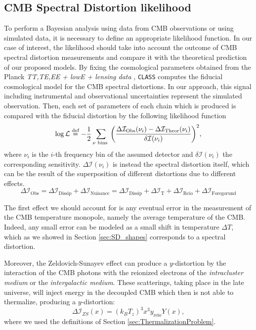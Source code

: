 \subsection{CMB Spectral Distortion likelihood} 
To perform a Bayesian analysis using data from CMB observations or using simulated data, it is necessary to define an appropriate likelihood function. In our case of interest, the likelihood should take into account the outcome of CMB spectral distortion measurements and compare it with the theoretical prediction of our proposed models. By fixing the cosmological parameters obtained from the Planck \emph{TT,TE,EE + lowE + lensing data} \cite{planck2018results}, \texttt{CLASS} computes the fiducial cosmological model for the CMB spectral distortions. In our approach, this signal including instrumental and observational uncertainties represent the simulated observation. Then, each set of parameters of each chain which is produced is compared with the fiducial distortion by the following likelihood function
\begin{equation}
    \log \mathcal L\stackrel{\text{def}}{=} -\frac12 \sum_{\nu \text{ bins }}\bigg(\frac{\Delta\mathcal I_\text{Obs}(\nu_i)-\Delta\mathcal I_\text{Theor}(\nu_i)}{\delta \mathcal I(\nu_i)}\bigg)^2,
\end{equation}
where $\nu_i$ is the $i$-th frequency bin of the assumed detector and $\delta \mathcal I(\nu_i)$ the corresponding sensitivity. $\Delta \mathcal I(\nu_i)$ is instead the spectral distortion itself, which can be the result of the superposition of different distortions due to different effects.
$$\Delta \mathcal I_\text{Obs}=\Delta\mathcal I_\text{Dissip}+\Delta \mathcal I_\text{Nuisance}=\Delta\mathcal I_\text{Dissip}+\Delta \mathcal I_\text{T}+\Delta \mathcal I_\text{Reio} +\Delta \mathcal I_\text{Foregorund}$$

The first effect we should account for is any eventual error in the measurement of the CMB temperature monopole, namely the average temperature of the CMB. Indeed, any small error can be modeled as a small shift in temperature $\Delta T$, which as we showed in Section \ref{sec:SD_shapes} corresponds to a spectral distortion.

Moreover, the Zeldovich-Sunayev effect \cite{Zeldovich1972} can produce a $y$-distortion by the interaction of the CMB photons with the reionized electrons of the \emph{intracluster medium} or the \emph{intergalactic medium}. These scatterings, taking place in the late universe, will inject energy in the decoupled CMB which then is not able to thermalize, producing a $y$-distortion:
$$ \Delta \mathcal I_{ZS}(x)=(k_BT_z)^3x^3 y_\text{reio} Y(x),$$
where we used the definitions of Section \ref{sec:ThermalizationProblem}.

